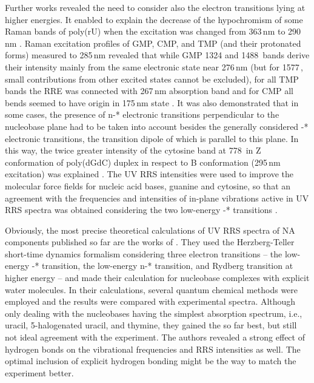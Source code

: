 Further works revealed the need to consider also the electron transitions lying
at higher energies.
It enabled to explain the decrease of the hypochromism of some Raman bands of
poly(rU) when the excitation was changed from 363\,nm to 290\,nm
\parencite{Chinsky1980}.
Raman excitation profiles of GMP, CMP, and TMP (and their protonated forms)
measured to 285\,nm revealed that while GMP 1324 and 1488\,\icm{} bands derive
their intensity mainly from the same electronic state near 276\,nm (but for
1577\,\icm{}, small contributions from other excited states cannot be
excluded), for all TMP bands the RRE was connected with 267\,nm absorption band
and for CMP all bends seemed to have origin in 175\,nm state
\parencite{Samanta1982}.
It was also demonstrated that in some cases, the presence of n-*
electronic transitions perpendicular to the nucleobase plane had to be taken
into account besides the generally considered -* electronic
transitions, the transition dipole of which is parallel to this plane.
In this way, the twice greater intensity of the cytosine band at 778\,\icm{} in
Z conformation of poly(dGdC) duplex in respect to B conformation (295\,nm
excitation) was explained
\parencite{Chinsky1984}.
The UV RRS intensities were used to improve the molecular force fields for
nucleic acid bases, guanine and cytosine, so that an agreement with the
frequencies and intensities of in-plane vibrations active in UV RRS spectra was
obtained considering the two low-energy -* transitions
\parencite{Lagant1991}.

Obviously, the most precise theoretical calculations of UV RRS spectra of NA
components published so far are the works of
\textcite{%
	Sun2014,%
	Sun2015,%
	Sun2017%
}.
They used the Herzberg-Teller short-time dynamics formalism considering three
electron transitions --
	the low-energy -* transition,
	the low-energy n-* transition,
	and Rydberg transition at higher energy
-- and made their calculation for nucleobase complexes with explicit water
molecules.
In their calculations, several quantum chemical methods were employed and the
results were compared with experimental spectra.
Although only dealing with the nucleobases having the simplest absorption
spectrum, i.e., uracil, 5-halogenated uracil, and thymine, they gained the so
far best, but still not ideal agreement with the experiment.
The authors revealed a strong effect of hydrogen bonds on the vibrational
frequencies and RRS intensities as well.
The optimal inclusion of explicit hydrogen bonding might be the way to match
the experiment better.


